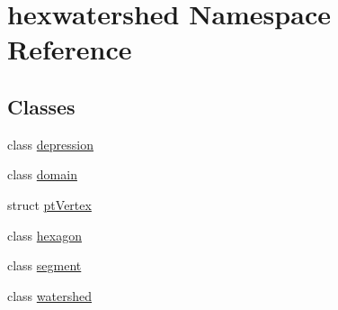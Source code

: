 \hypertarget{namespacehexwatershed}{\section{hexwatershed Namespace Reference}
\label{namespacehexwatershed}
}
\subsection*{Classes}
\begin{DoxyCompactItemize}
\item 
class \hyperlink{classhexwatershed_1_1depression}{depression}
\item 
class \hyperlink{classhexwatershed_1_1domain}{domain}
\item 
struct \hyperlink{structhexwatershed_1_1ptVertex}{pt\-Vertex}
\item 
class \hyperlink{classhexwatershed_1_1hexagon}{hexagon}
\item 
class \hyperlink{classhexwatershed_1_1segment}{segment}
\item 
class \hyperlink{classhexwatershed_1_1watershed}{watershed}
\end{DoxyCompactItemize}
